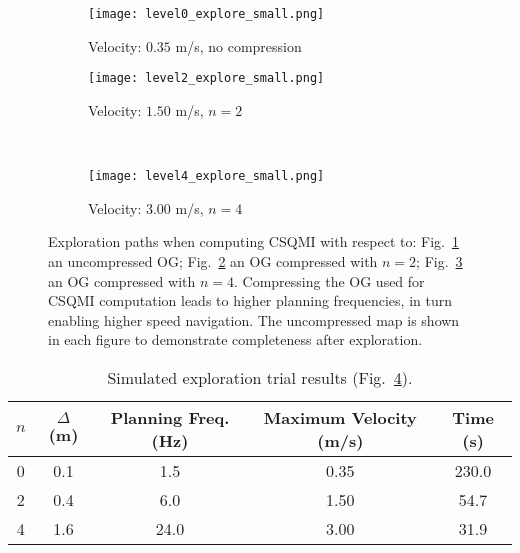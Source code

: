 \begin{figure}
    \centering
    \begin{subfigure}[t]{0.48\textwidth}
        \centering
        \texttt{[image: level0\_explore\_small.png]}
        \caption{Velocity: $0.35$ m/s, no compression
        \label{fig:pri_result3_a}}
    \end{subfigure}
    \hfill
    \begin{subfigure}[t]{0.48\textwidth}
        \centering
        \texttt{[image: level2\_explore\_small.png]}
        \caption{Velocity: $1.50$ m/s, $n=2$
        \label{fig:pri_result3_b}}
    \end{subfigure}
    \\
    \begin{subfigure}[t]{0.48\textwidth}
        \centering
        \texttt{[image: level4\_explore\_small.png]}
        \caption{Velocity: $3.00$ m/s, $n=4$
        \label{fig:pri_result3_c}}
    \end{subfigure}
    \caption[Simulated exploration trials with map compression.]{Exploration paths when computing CSQMI with respect
    to: Fig.~\ref{fig:pri_result3_a} an uncompressed OG; Fig.~\ref{fig:pri_result3_b} an
OG compressed with $n=2$; Fig.~\ref{fig:pri_result3_c} an OG compressed with $n=4$.
Compressing the OG used for CSQMI computation leads to higher planning
frequencies, in turn enabling higher speed navigation. The uncompressed map is
shown in each figure to demonstrate completeness after exploration.
\label{fig:pri_result3}}
\end{figure}

\begin{table}[t]
  \caption[Simulated exploration trial results.]{Simulated exploration trial results
  (Fig.~\ref{fig:pri_result3}).\label{tab:pri_result_table}}
  \centering
  \begin{tabular}{| c | c | c | c | c |}
    \hline
    $n$ & {$\Delta$} (m) & Planning Freq. (Hz) &
            Maximum Velocity (m/s) & Time (s) \\ \hline
                                 0 & 0.1 & 1.5 & 0.35 & 230.0 \\ \hline
                                 2 & 0.4 & 6.0 & 1.50 & 54.7 \\ \hline
                                 4 & 1.6 & 24.0 & 3.00 & 31.9 \\ \hline
  \end{tabular}
\end{table}

